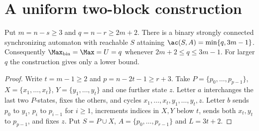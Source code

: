 \section{A uniform two-block construction}
\begin{theorem}\label{thm:two-block}
Put $m=n-s\ge3$ and $q=n-r\ge2m+2$.
There is a binary strongly connected synchronizing automaton with reachable
$S$ attaining $\ac(S,A)=\min\{q,3m-1\}$.
Consequently $\Max_{\rm bin}=\Max=U=q$ whenever $2m+2\le q\le3m-1$.
For larger $q$ the construction gives only a lower bound.
\end{theorem}
\begin{proof}
Write $t=m-1\ge2$ and $p=n-2t-1\ge r+3$.
Take $P=\{p_0,\ldots,p_{p-1}\}$, $X=\{x_1,\ldots,x_t\}$,
$Y=\{y_1,\ldots,y_t\}$ and one further state $z$.
Letter $a$ interchanges the last two $P$-states, fixes the others, and
cycles $x_1,\ldots,x_t,y_1,\ldots,y_t,z$.
Letter $b$ sends $p_0$ to $y_1$, $p_i$ to $p_{i-1}$ for $i\ge1$,
increments indices in $X,Y$ below $t$, sends both $x_t,y_t$ to $p_{p-1}$,
and fixes $z$. Put $S=P\cup X$, $A=\{p_0,\ldots,p_{r-1}\}$ and $L=3t+2$.


\end{proof}
